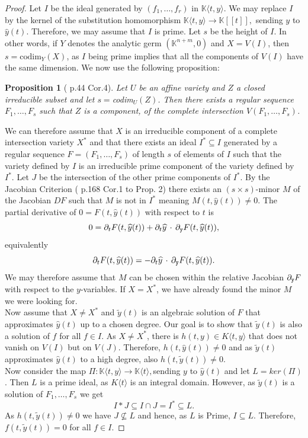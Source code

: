 \documentclass[10pt, a4paper]{article}
\def\wh{\widehat}
\newtheorem{proposition}{Proposition}[section]
\theoremstyle{remark}
\theoremstyle{remark}
\begin{document}
\begin{proof}
    Let $I$ be the ideal generated by $(f_1,\ldots,f_r)$ in $\mathbb{K}\langle t,y\rangle$. We may replace $I$ by the kernel of the substitution homomorphism $\mathbb{K}\langle t,y \rangle \rightarrow \mathbb{K}[[t]],$ sending $y$ to $\wh{y}(t)$. Therefore, we may assume that $I$ is prime. Let $s$ be the height of $I$. In other words, if $Y$ denotes the analytic germ $(\mathbb{K}^{n+m},0)$ and $X=V(I)$, then $s=\mathrm{codim}_Y(X)$, as $I$ being prime implies that all the components of $V(I)$ have the same dimension.
    We now use the following proposition:
    \begin{proposition}[\cite{Mumford} p.44 Cor.4]
        Let $U$ be an affine variety and $Z$ a closed irreducible subset and let $s=$codim$_U(Z)$. Then there exists a regular sequence $F_1,\ldots,F_s$ such that $Z$ is a component, of the complete intersection $V(F_1,\ldots,F_s)$.
    \end{proposition}
    \noindent We can therefore assume that $X$ is an irreducible component of a complete intersection variety $X^*$ and that there exists an ideal $I^*\subseteq I$ generated by a regular sequence $F=(F_1,\ldots,F_s)$ of length $s$ of elements of $I$ such that the variety defined by $I$ is an irreducible prime component of the variety defined by $I^*$. Let $J$ be the intersection of the other prime components of $I^*$. By the Jacobian Criterion (\cite{Mumford} p.168 Cor.1 to Prop. 2) there exists an $(s\times s)$-minor $M$ of the Jacobian $DF$ such that $M$ is not in $I^*$ meaning $M(t,\widehat{y}(t))\neq 0$. The partial derivative of $0=F(t,\widehat{y}(t))$ with respect to $t$ is $$0=\partial_{t}F(t,\widehat{y}(t))+\partial_{t}\widehat{y}\,\cdot\,\partial_{\tt{y}}F(t,\widehat{y}(t)),$$
equivalently 
$$\partial_{t}F(t,\widehat{y}(t))=-\partial_{t}\widehat{y}\,\cdot\,\partial_{\tt{y}}F(t,\widehat{y}(t)).$$
We may therefore assume that $M$ can be chosen within the relative Jacobian $\partial_{\tt{y}}F$ with respect to the $y$-variables. If $X=X^*$, we have already found the minor $M$ we were looking for.
\\Now assume that $X\neq X^*$ and $\widetilde{y}(t)$ is an algebraic solution of $F$ that approximates $\widehat{y}(t)$ up to a chosen degree. Our goal is to show that $\widetilde{y}(t)$ is also a solution of $f$ for all $f\in I$. As $X\neq X^*$, there is $h(t,y)\in K\langle t,y\rangle$ that does not vanish on $V(I)$ but on $V(J)$. Therefore, $h(t,\widehat{y}(t))\neq 0$ and as $\widetilde{y}(t)$ approximates $\widehat{y}(t)$ to a high degree, also $h(t,\widetilde{y}(t))\neq 0$.
\\Now consider the map $\Pi:\mathbb{K}\langle t,y \rangle \rightarrow \mathbb{K}\langle t\rangle,$sending $y$ to $\wh{y}(t)$ and let $L=ker(\Pi)$. Then $L$ is a prime ideal, as $K\langle t \rangle$ is an integral domain. However, as $\widetilde{y}(t)$ is a solution of $F_1,\ldots,F_s$ we get 
$$I*J\subseteq I\cap J =I^*\subseteq L .$$
As $h(t,\widetilde{y}(t))\neq 0$ we have $J\nsubseteq L$ and hence, as $L$ is Prime, $I\subseteq L$. Therefore, $f(t,\widetilde{y}(t))=0$ for all $f\in I$.
\end{proof}
\end{document}
